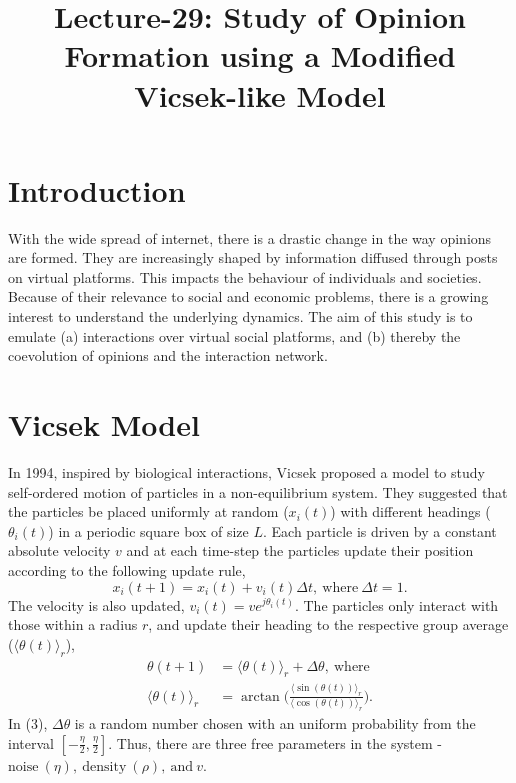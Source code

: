 \documentclass[letterpaper,english,11pt]{article}
\title{Lecture-29: Study of Opinion Formation using a Modified Vicsek-like Model}
\begin{document}
\maketitle
\section{Introduction}

 With the wide spread of internet, there is a drastic change in the way opinions are formed. They are increasingly shaped by information diffused through posts on virtual platforms. This impacts the behaviour of individuals and societies. Because of their relevance to social and economic problems, there is a growing interest to understand the underlying dynamics. The aim of this study is to emulate (a) interactions over virtual social platforms, and (b) thereby the coevolution of opinions and the interaction network.

\section{Vicsek Model}

In 1994, inspired by biological interactions, Vicsek proposed a model to study self-ordered motion of particles in a non-equilibrium system. They suggested that the particles be placed uniformly at random ($x_{i}(t)$) with different headings ($\theta_{i}(t)$) in a periodic square box of size $L$.  Each particle is driven by a constant absolute velocity $v$ and at each time-step the particles update their position according to the following update rule, 
\begin{equation}
x_{i}(t+1)= x_{i}(t)+ v_{i}(t)\Delta t,~\text{where}~\Delta t = 1.
 \end{equation}
The velocity is also updated, $v_{i}(t) = v e^{j\theta_{i}(t)}.$ The particles only interact with those within a radius $r$, and update their heading to the respective group average ($\langle \theta(t)\rangle_{r}$), 
\begin{align}
\theta(t+1) &= \langle \theta(t)\rangle_{r} +\Delta \theta,~\text{where} \\
\langle \theta(t)\rangle_{r} &= \arctan \bigg(\frac{\langle\sin(\theta(t))\rangle_{r}}{\langle\cos(\theta(t))\rangle_{r}}\bigg).
\end{align}
In (3), $\Delta \theta$ is a random number chosen with an uniform probability from the interval $[-\frac{\eta}{2},\frac{\eta}{2}]$. Thus, there are three free parameters in the system - $\text{noise}~(\eta),~\text{density}~(\rho),~\text{and}~v$. 
\end{document}
